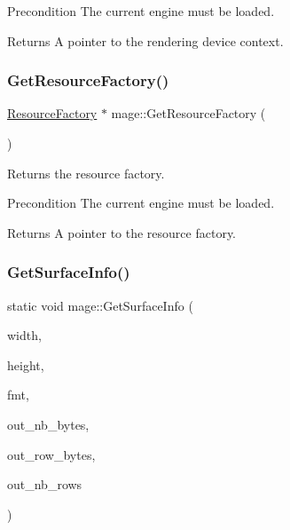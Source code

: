 \begin{DoxyPrecond}{Precondition}
The current engine must be loaded. 
\end{DoxyPrecond}
\begin{DoxyReturn}{Returns}
A pointer to the rendering device context. 
\end{DoxyReturn}
\hypertarget{namespacemage_a36a7338e52586e714ef646dea200a115}{}\label{namespacemage_a36a7338e52586e714ef646dea200a115} 
\subsubsection{\texorpdfstring{Get\+Resource\+Factory()}{GetResourceFactory()}}
{\footnotesize\ttfamily \hyperlink{classmage_1_1_resource_factory}{Resource\+Factory} $\ast$ mage\+::\+Get\+Resource\+Factory (\begin{DoxyParamCaption}{ }\end{DoxyParamCaption})}

Returns the resource factory.

\begin{DoxyPrecond}{Precondition}
The current engine must be loaded. 
\end{DoxyPrecond}
\begin{DoxyReturn}{Returns}
A pointer to the resource factory. 
\end{DoxyReturn}
\hypertarget{namespacemage_a7b67bb6f38f3e787fb3561d236b88bd2}{}\label{namespacemage_a7b67bb6f38f3e787fb3561d236b88bd2} 
\subsubsection{\texorpdfstring{Get\+Surface\+Info()}{GetSurfaceInfo()}}
{\footnotesize\ttfamily static void mage\+::\+Get\+Surface\+Info (\begin{DoxyParamCaption}\item[{\+\_\+\+In\+\_\+ size\+\_\+t}]{width,  }\item[{\+\_\+\+In\+\_\+ size\+\_\+t}]{height,  }\item[{\+\_\+\+In\+\_\+ D\+X\+G\+I\+\_\+\+F\+O\+R\+M\+AT}]{fmt,  }\item[{\+\_\+\+Out\+\_\+opt\+\_\+ size\+\_\+t $\ast$}]{out\+\_\+nb\+\_\+bytes,  }\item[{\+\_\+\+Out\+\_\+opt\+\_\+ size\+\_\+t $\ast$}]{out\+\_\+row\+\_\+bytes,  }\item[{\+\_\+\+Out\+\_\+opt\+\_\+ size\+\_\+t $\ast$}]{out\+\_\+nb\+\_\+rows }\end{DoxyParamCaption})\hspace{0.3cm}{\ttfamily [static]}}

